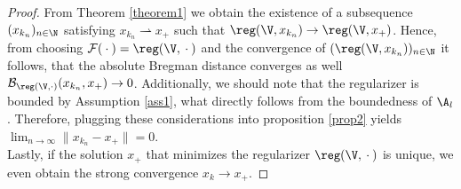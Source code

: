 \begin{proof}
From Theorem \ref{theorem1} we obtain the existence of a subsequence $(x_{k_n})_{n\in\N}$ satisfying $x_{k_n} \rightharpoonup x_+$ such that $\reg(\V,x_{k_n}) \to \reg(\V,x_+)$. Hence, from choosing $\mathcal{F}(\wc) = \reg(\V,\wc)$ and the convergence of $(\reg(\V,x_{k_n}))_{n\in\N}$ it follows, that the absolute Bregman distance converges as well $\mathcal{B}_{\reg(\V,\wc)}(x_{k_n},x_+) \to 0$. Additionally, we should note that the regularizer is bounded by Assumption \ref{ass1}, what directly follows from the boundedness of $\A_l$. Therefore, plugging these considerations into proposition \ref{prop2} yields $\lim_{n\to \infty} \|x_{k_n} - x_+\| = 0$.\\
Lastly, if the solution $x_+$ that minimizes the regularizer $\reg(\V,\wc)$ is unique, we even obtain the strong convergence $x_k \to x_+$.
\end{proof}
